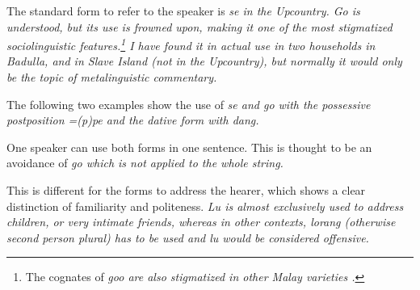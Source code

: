 
The standard form to refer to the speaker is \em se \em in the Upcountry. \em Go \em is understood, but its use is frowned upon, making it one of the most stigmatized sociolinguistic features.\footnote{The cognates of \em goo \em are also stigmatized in other Malay varieties  \citep[cf.][]{Ansaldo2009book}.} I have found it in actual use in two households in Badulla, and in Slave Island (not in the Upcountry), but normally it would only be the topic of metalinguistic commentary.

The following two examples show the use of \em se \em and \em go \em with the possessive postposition \em =(p)pe \em and the dative form with \em dang\em.



One speaker can use both forms in one sentence. This is thought to be an avoidance of \em go \em which is not applied to the whole string.


This is different for the forms to address the hearer, which shows a clear distinction of familiarity and politeness. \em Lu \em is almost exclusively used to address children, or very intimate friends, whereas in other contexts, \em lorang \em (otherwise second person plural) has to be used and \em lu \em would be considered offensive.

